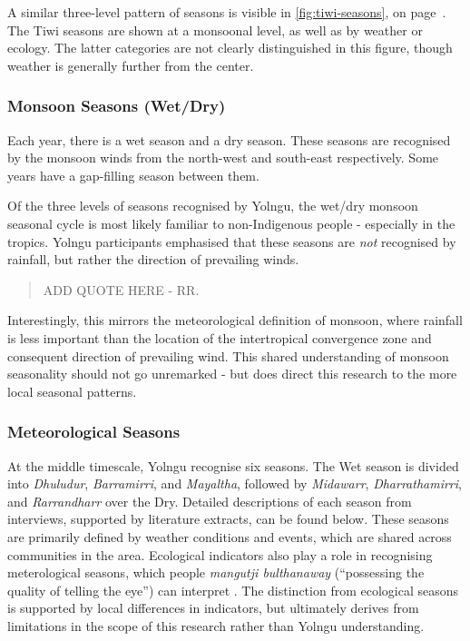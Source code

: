 A similar three-level pattern of seasons is visible in \cref{fig:tiwi-seasons},
on page~\pageref{fig:tiwi-seasons}.  The Tiwi seasons are shown at a monsoonal level,
as well as by weather or ecology.  The latter categories are not clearly distinguished
in this figure, though weather is generally further from the center.


\subsubsection{Monsoon Seasons (Wet/Dry)}

Each year, there is a wet season and a dry season.  These seasons are
recognised by the monsoon winds from the north-west and south-east
respectively.  Some years have a gap-filling season between them.

Of the three levels of seasons recognised by Yolngu,
the wet/dry monsoon seasonal cycle is most likely familiar to non-Indigenous people -
especially in the tropics.  Yolngu participants emphasised that these seasons
are \emph{not} recognised by rainfall, but rather the direction of prevailing winds.

\blockquote{
    ADD QUOTE HERE - RR.
}

Interestingly, this mirrors the meteorological definition of monsoon,
where rainfall is less important than the location of the intertropical
convergence zone and consequent direction of prevailing wind.
This shared understanding of monsoon seasonality should not go unremarked -
but does direct this research to the more local seasonal patterns.


\subsubsection{Meteorological Seasons}

At the middle timescale, Yolngu recognise six seasons.
The Wet season is divided into \textit{Dhuludur}, \textit{Barramirri},
and \textit{Mayaltha}, followed by \textit{Midawarr}, \textit{Dharrathamirri},
and \textit{Rarrandharr} over the Dry.  Detailed descriptions of each
season from interviews, supported by literature extracts, can be found below.
%
These seasons are primarily defined by weather conditions and events,
which are shared across communities in the area.  Ecological indicators
also play a role in recognising meterological seasons, which people
\textit{mangutji bulthanaway} (``possessing the quality of telling the eye'')
can interpret \citep[p35]{atlas2014}.  The distinction from ecological
seasons is supported by local differences in indicators, but ultimately
derives from limitations in the scope of this research rather than
Yolngu understanding.

